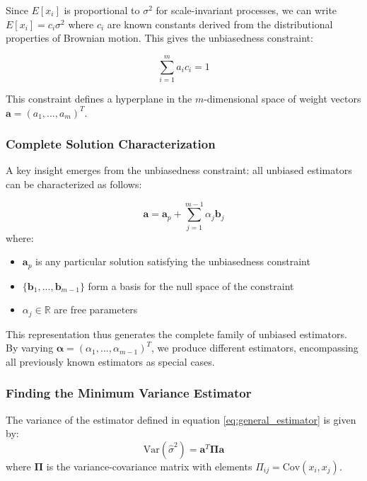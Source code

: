 Since $E[x_i]$ is proportional to $\sigma^2$ for scale-invariant processes, we can write $E[x_i] = c_i \sigma^2$ where $c_i$ are known constants derived from the distributional properties of Brownian motion. This gives the unbiasedness constraint:

\begin{equation}
\sum_{i=1}^m a_i c_i = 1
\label{eq:unbiased_constraint}
\end{equation}

This constraint defines a hyperplane in the $m$-dimensional space of weight vectors $\mathbf{a} = (a_1, ..., a_m)^T$.

\subsubsection{Complete Solution Characterization}

A key insight emerges from the unbiasedness constraint: all unbiased estimators can be characterized as follows:

\begin{equation}
\mathbf{a} = \mathbf{a}_p + \sum_{j=1}^{m-1} \alpha_j \mathbf{b}_j
\label{eq:complete_solution}
\end{equation}
where:
\begin{itemize}
\item $\mathbf{a}_p$ is any particular solution satisfying the unbiasedness constraint
\item $\{\mathbf{b}_1, ..., \mathbf{b}_{m-1}\}$ form a basis for the null space of the constraint
\item $\alpha_j \in \mathbb{R}$ are free parameters
\end{itemize}

This representation thus generates the complete family of unbiased estimators. By varying $\boldsymbol{\alpha} = (\alpha_1, ..., \alpha_{m-1})^T$, we produce different estimators, encompassing all previously known estimators as special cases.

\subsubsection{Finding the Minimum Variance Estimator}

The variance of the estimator defined in equation \eqref{eq:general_estimator} is given by:
\begin{equation}
\text{Var}(\hat{\sigma}^2) = \mathbf{a}^T \boldsymbol{\Pi} \mathbf{a}
\end{equation}
where $\boldsymbol{\Pi}$ is the variance-covariance matrix with elements $\Pi_{ij} = \text{Cov}(x_i, x_j)$.

